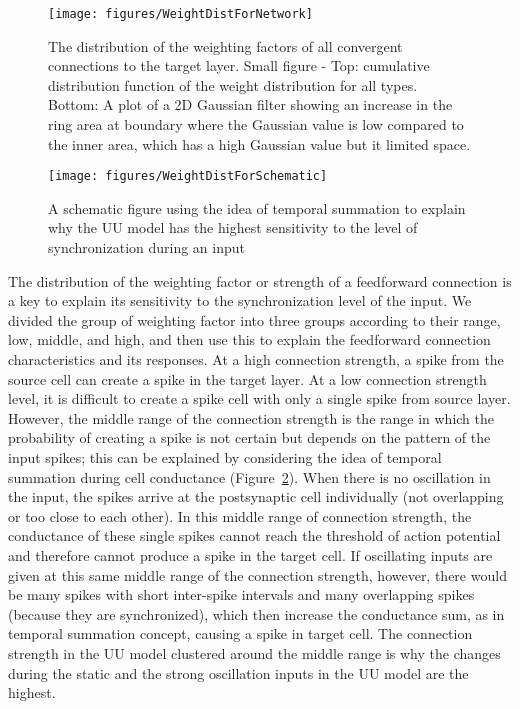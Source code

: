 \begin{figure}[!h]
	\centering
	\texttt{[image: figures/WeightDistForNetwork]}
	\caption{The distribution of the weighting factors of all convergent connections to the target layer. Small figure - Top: cumulative distribution function of the weight distribution for all types. Bottom: A plot of a 2D Gaussian filter showing an increase in the ring area at boundary where the Gaussian value is low compared to the inner area, which has a high Gaussian value but it limited space.} 
	\label{fig:WdistNN}
\end{figure}


\begin{figure}[!h]
	\centering
	\texttt{[image: figures/WeightDistForSchematic]}
	\caption{A schematic figure using the idea of temporal summation \cite{magee1999dendritic} to explain why the UU model has the highest sensitivity to the level of synchronization during an input} 
	\label{fig:WdistSchematic}
\end{figure}



 The distribution of the weighting factor or strength of a feedforward connection is a key to explain its sensitivity to the synchronization level of the input. We divided the group of weighting factor into three groups according to their range, low, middle, and high, and then use this to explain the feedforward connection characteristics and its responses. At a high connection strength, a spike from the source cell can create a spike in the target layer. At a low connection strength level, it is difficult to create a spike cell with only a single spike from source layer. However, the middle range of the connection strength is the range in which the probability of creating a spike is not certain but depends on the pattern of the input spikes; this can be explained by considering the idea of temporal summation during cell conductance (Figure~\ref{fig:WdistSchematic}). When there is no oscillation in the input, the spikes arrive at the postsynaptic cell individually (not overlapping or too close to each other). In this middle range of connection strength, the conductance of these single spikes cannot reach the threshold of action potential and therefore cannot produce a spike in the target cell. If oscillating inputs are given at this same middle range of the connection strength, however, there would be many spikes with short inter-spike intervals and many overlapping spikes (because they are synchronized), which then increase the conductance sum, as in temporal summation concept, causing a spike in target cell. The connection strength in the UU model clustered around the middle range is why the changes during the static and the strong oscillation inputs in the UU model are the highest. 




